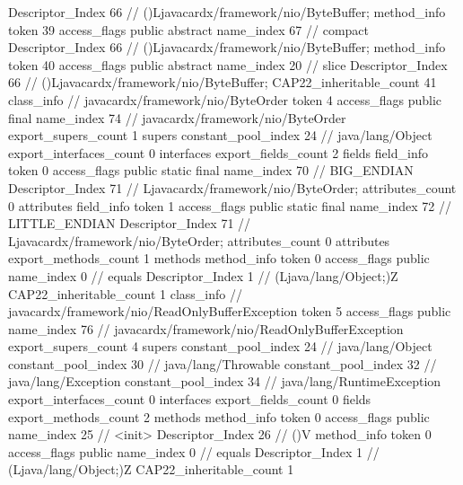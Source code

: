 {{{{{					Descriptor_Index	66		// ()Ljavacardx/framework/nio/ByteBuffer;
				}
				method_info {
					token	39
					access_flags	public abstract
					name_index	67		// compact
					Descriptor_Index	66		// ()Ljavacardx/framework/nio/ByteBuffer;
				}
				method_info {
					token	40
					access_flags	public abstract
					name_index	20		// slice
					Descriptor_Index	66		// ()Ljavacardx/framework/nio/ByteBuffer;
				}
			}
			CAP22_inheritable_count	41
		}
		class_info {		// javacardx/framework/nio/ByteOrder
			token	4
			access_flags	public final
			name_index	74		// javacardx/framework/nio/ByteOrder
			export_supers_count	1
			supers {
				constant_pool_index	24		// java/lang/Object
			}
			export_interfaces_count	0
			interfaces {
			}
			export_fields_count	2
			fields {
			field_info {
				token	0
				access_flags	public static final
				name_index	70		// BIG_ENDIAN
				Descriptor_Index	71		// Ljavacardx/framework/nio/ByteOrder;
				attributes_count	0
				attributes {
				}
			}
			field_info {
				token	1
				access_flags	public static final
				name_index	72		// LITTLE_ENDIAN
				Descriptor_Index	71		// Ljavacardx/framework/nio/ByteOrder;
				attributes_count	0
				attributes {
				}
			}
			}
			export_methods_count	1
			methods {
				method_info {
					token	0
					access_flags	public
					name_index	0		// equals
					Descriptor_Index	1		// (Ljava/lang/Object;)Z
				}
			}
			CAP22_inheritable_count	1
		}
		class_info {		// javacardx/framework/nio/ReadOnlyBufferException
			token	5
			access_flags	public
			name_index	76		// javacardx/framework/nio/ReadOnlyBufferException
			export_supers_count	4
			supers {
				constant_pool_index	24		// java/lang/Object
				constant_pool_index	30		// java/lang/Throwable
				constant_pool_index	32		// java/lang/Exception
				constant_pool_index	34		// java/lang/RuntimeException
			}
			export_interfaces_count	0
			interfaces {
			}
			export_fields_count	0
			fields {
			}
			export_methods_count	2
			methods {
				method_info {
					token	0
					access_flags	public
					name_index	25		// <init>
					Descriptor_Index	26		// ()V
				}
				method_info {
					token	0
					access_flags	public
					name_index	0		// equals
					Descriptor_Index	1		// (Ljava/lang/Object;)Z
				}
			}
			CAP22_inheritable_count	1
		}
	}
}
